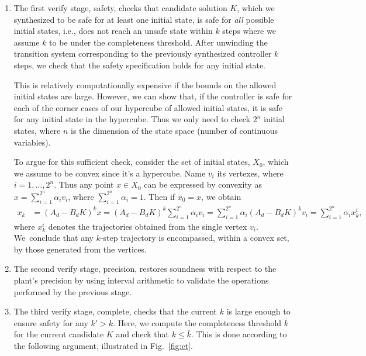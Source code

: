 \documentclass[runningheads,a4paper]{llncs}
\begin{document}
\begin{enumerate}
\item The first {\sc verify} stage, {\sc safety}, checks that candidate
solution $K$, which we synthesized to be safe for at least one initial state, is safe for \emph{all} possible initial states, i.e., does not reach an unsafe
state within $k$ steps where we assume $k$ to be under the completeness threshold. 
After unwinding the transition system corresponding to the previously synthesized controller
$k$ steps, we check that the safety specification holds for any initial state. 

This is relatively computationally expensive if the bounds on the
allowed initial states are large.  However, we can show that, if the
controller is safe for each of the corner cases of our hypercube of
allowed initial states, it is safe for any initial state in the
hypercube. Thus we only need to check $2^n$ initial states, where $n$
is the dimension of the state space (number of continuous variables). 

To argue for this sufficient check, 
consider the set of initial states, $X_0$, which we assume to be convex since it's a hypercube. 
Name $v_i$ its vertexes, where $i=1,\ldots, 2^n$.  
Thus any point $x \in X_0$ can be expressed by convexity as $x = \sum_{i=1}^{2^n} \alpha_i v_i$, 
where $\sum_{i=1}^{2^n} \alpha_i =1$. Then if $x_0=x$, we obtain 
\begin{align*}
x_k   &= (A_d - B_d K)^k x = (A_d - B_d K)^k \sum_{i=1}^{2^n} \alpha_i v_i 
      = \sum_{i=1}^{2^n} \alpha_i (A_d - B_d K)^k v_i = \sum_{i=1}^{2^n} \alpha_i x_k^i, 
 \end{align*}     
%
where $x_k^i$ denotes the trajectories obtained from the single vertex
$v_i$.  We~conclude that any $k$-step trajectory is encompassed, within a
convex set, by those generated from the vertices.

\item The second {\sc verify} stage, {\sc precision}, 
 restores soundness with respect to the plant's precision
by using interval arithmetic \cite{moore1966interval} to validate the 
operations performed by the previous stage. 

\item The third {\sc verify} stage, {\sc complete}, checks that the current
$k$ is large enough to ensure safety for any $k'{>}k$.  Here, we compute the
completeness threshold $\overline{k}$ for the current candidate $K$ and
check that $k{\leq}\overline{k}$.  This is done according to the following
argument, illustrated in Fig.~\ref{fig:ct}.


\end{enumerate}
\end{document}
